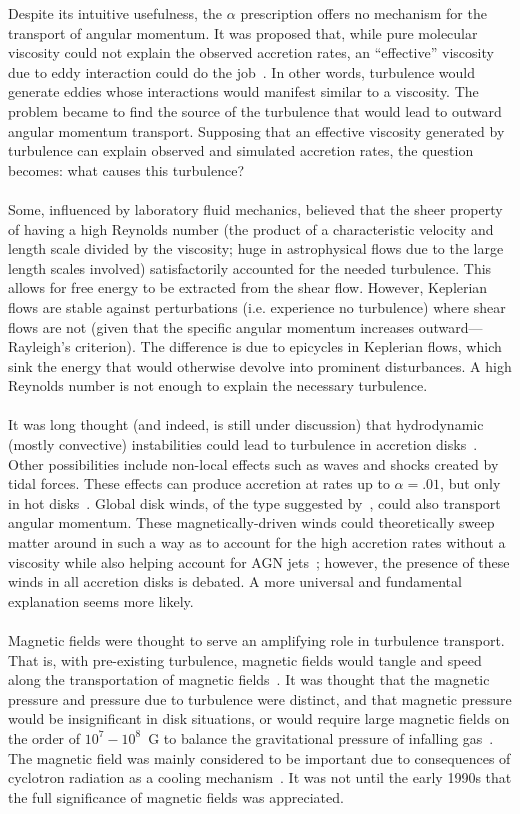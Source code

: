 Despite its intuitive usefulness, the $\alpha$ prescription offers no mechanism for the transport of angular momentum. It was proposed that, while pure molecular viscosity could not explain the observed accretion rates, an ``effective'' viscosity due to eddy interaction could do the job~\cite{BH1998}. In other words, turbulence would generate eddies whose interactions would manifest similar to a viscosity. The problem became to find the source of the turbulence that would lead to outward angular momentum transport. Supposing that an effective viscosity generated by turbulence can explain observed and simulated accretion rates, the question becomes: what causes this turbulence? \\
\\
Some, influenced by laboratory fluid mechanics, believed that the sheer property of having a high Reynolds number (the product of a characteristic velocity and length scale divided by the viscosity; huge in astrophysical flows due to the large length scales involved) satisfactorily accounted for the needed turbulence. This allows for free energy to be extracted from the shear flow. However, Keplerian flows are stable against perturbations (i.e. experience no turbulence) where shear flows are not (given that the specific angular momentum increases outward---Rayleigh's criterion). The difference is due to epicycles in Keplerian flows, which sink the energy that would otherwise devolve into prominent disturbances. A high Reynolds number is not enough to explain the necessary turbulence.\\
\\
It was long thought (and indeed, is still under discussion) that hydrodynamic (mostly convective) instabilities could lead to turbulence in accretion disks~\cite{Paczynski1978,Stone1999}. Other possibilities include non-local effects such as waves and shocks created by tidal forces. These effects can produce accretion at rates up to $\alpha=.01$, but only in hot disks~\cite{Spruit2009}. Global disk winds, of the type suggested by~\citet{Blandford1977}, could also transport angular momentum. These magnetically-driven winds could theoretically sweep matter around in such a way as to account for the high accretion rates without a viscosity while also helping account for AGN jets~\cite{Koenigl1989}; however, the presence of these winds in all accretion disks is debated. A more universal and fundamental explanation seems more likely.\\
\\
Magnetic fields were thought to serve an amplifying role in turbulence transport. That is, with pre-existing turbulence, magnetic fields would tangle and speed along the transportation of magnetic fields~\cite{SS1973}. It was thought that the magnetic pressure and pressure due to turbulence were distinct, and that magnetic pressure would be insignificant in disk situations, or would require large magnetic fields on the order of $10^7-10^8$~G to balance the gravitational pressure of infalling gas~\cite{BH1998}. The magnetic field was mainly considered to be important due to consequences of cyclotron radiation as a cooling mechanism~\cite{Shapiro1973}. It was not until the early 1990s that the full significance of magnetic fields was appreciated.\\
